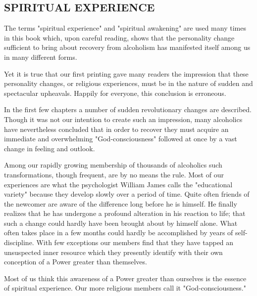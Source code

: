 

\subsection*{SPIRITUAL EXPERIENCE}

\begin{biblechapter}
    The terms "spiritual experience" 
    and "spiritual awakening" are used many times in this book 
    which, upon careful reading, 
    shows that the personality change 
    sufficient to bring about recovery from alcoholism has manifested
    itself among us in many different forms.

Yet it is true that our first printing 
    gave many readers the impression that these personality changes, 
    or religious experiences, 
    must be in the nature of sudden and spectacular upheavals.
\verse Happily for everyone, this conclusion is erroneous.

\verse In the first few chapters 
    a number of sudden revolutionary changes are described.
\verse Though it was not our intention to create such an impression, 
    many alcoholics have nevertheless concluded that 
    in order to recover they must acquire an immediate and overwhelming 
    "God-consciousness" 
    followed at once by a vast change in feeling and outlook.
\end{biblechapter}

\begin{biblechapter}
    Among our rapidly growing membership of thousands of alcoholics 
    such transformations, though frequent, are by no means the rule.
\verse Most of our experiences
    are what the psychologist William James calls 
    the "educational variety" 
    because they develop slowly over a period of time.
\verse Quite often friends of the newcomer are aware of the difference 
    long before he is himself.
\verse He finally realizes that he has undergone a profound alteration 
    in his reaction to life; 
    that such a change could hardly have been brought about 
    by himself alone.
\verse What often takes place in a few months 
    could hardly be accomplished by years of self-discipline.
\verse With few exceptions our members find 
    that they have tapped an unsuspected inner resource 
    which they presently identify with 
    their own conception of a Power greater than themselves.
 
Most of us think this awareness of a Power greater than ourselves 
    is the essence of spiritual experience.
\verse Our more religious members call it "God-consciousness."
\end{biblechapter}

